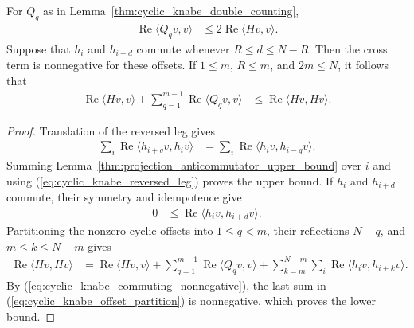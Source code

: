 \begin{lemma}
    \label{thm:cyclic_knabe_cross_estimates}
    \leanok
    For $Q_q$ as in Lemma~\ref{thm:cyclic_knabe_double_counting},
    \begin{align}
        \operatorname{Re}\langle Q_qv,v\rangle
         & \leq2\operatorname{Re}\langle Hv,v\rangle.
    \end{align}
    Suppose that $h_i$ and $h_{i+d}$ commute whenever
    $R\leq d\leq N-R$. Then the cross term is nonnegative for these offsets.
    If $1\leq m$, $R\leq m$, and $2m\leq N$, it follows that
    \begin{align}
        \operatorname{Re}\langle Hv,v\rangle
        +\sum_{q=1}^{m-1}\operatorname{Re}\langle Q_qv,v\rangle
         & \leq\operatorname{Re}\langle Hv,Hv\rangle.
    \end{align}
\end{lemma}

\begin{proof}
    \leanok
    Translation of the reversed leg gives
    \begin{align}
        \sum_i\operatorname{Re}\langle h_{i+q}v,h_i v\rangle
         & =\sum_i\operatorname{Re}\langle h_i v,h_{i-q}v\rangle.
        \label{eq:cyclic_knabe_reversed_leg}
    \end{align}
    Summing Lemma~\ref{thm:projection_anticommutator_upper_bound} over $i$
    and using (\ref{eq:cyclic_knabe_reversed_leg}) proves the upper bound.
    If $h_i$ and $h_{i+d}$ commute, their symmetry and idempotence give
    \begin{align}
        0 & \leq\operatorname{Re}\langle h_i v,h_{i+d}v\rangle.
        \label{eq:cyclic_knabe_commuting_nonnegative}
    \end{align}
    Partitioning the nonzero cyclic offsets into $1\leq q<m$, their
    reflections $N-q$, and $m\leq k\leq N-m$ gives
    \begin{align}
        \operatorname{Re}\langle Hv,Hv\rangle
         & =\operatorname{Re}\langle Hv,v\rangle
        +\sum_{q=1}^{m-1}\operatorname{Re}\langle Q_qv,v\rangle
        +\sum_{k=m}^{N-m}\sum_i
        \operatorname{Re}\langle h_i v,h_{i+k}v\rangle.
        \label{eq:cyclic_knabe_offset_partition}
    \end{align}
    By (\ref{eq:cyclic_knabe_commuting_nonnegative}), the last sum in
    (\ref{eq:cyclic_knabe_offset_partition}) is nonnegative, which proves the
    lower bound.
\end{proof}

